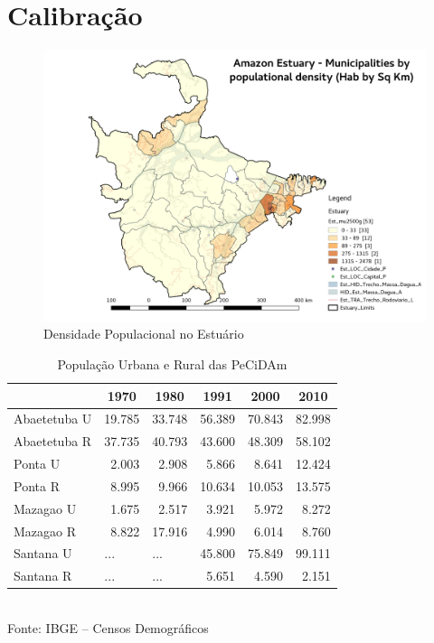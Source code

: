 \documentclass[12pt,a4paper,oneside]{erdc}
\begin{document}
  \lipsum[12-13]

\section{Calibração}

\begin{figure}
	\centering
	\includegraphics[width=\linewidth]{../figs/Estuary_PopDensity}
	\caption{Densidade Populacional no Estuário}
	\label{fig:estuarypopdensity}
\end{figure}
  
\lipsum[12-13]
  
\begin{table}[htbp]
\centering
	\caption{População Urbana e Rural das PeCiDAm}
	\begin{tabular}{l|rrrrr}
		\hline
		& \multicolumn{1}{c}{1970} & \multicolumn{1}{c}{1980} & \multicolumn{1}{c}{1991} & \multicolumn{1}{c}{2000} & \multicolumn{1}{c}{2010} \\ \hline
		Abaetetuba U & 19.785 & 33.748 & 56.389 & 70.843 & 82.998 \\ 
		Abaetetuba R & 37.735 & 40.793 & 43.600 & 48.309 & 58.102 \\ \hline
		Ponta U & 2.003 & 2.908 & 5.866 & 8.641 & 12.424 \\ 
		Ponta R & 8.995 & 9.966 & 10.634 & 10.053 & 13.575 \\ \hline
		Mazagao U & 1.675 & 2.517 & 3.921 & 5.972 & 8.272 \\ 
		Mazagao R & 8.822 & 17.916 & 4.990 & 6.014 & 8.760 \\ \hline
		Santana U & \multicolumn{1}{l}{...} & \multicolumn{1}{l}{...} & 45.800 & 75.849 & 99.111 \\ 
		Santana R & \multicolumn{1}{l}{...} & \multicolumn{1}{l}{...} & 5.651 & 4.590 & 2.151 \\ \hline
		\end{tabular}\\
		Fonte: IBGE – Censos Demográficos 
		\label{tab:popURPeCiDAm}
\end{table}
\end{document}
